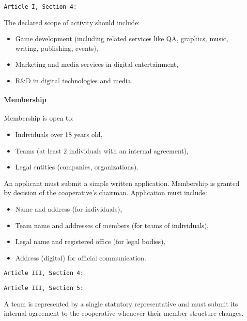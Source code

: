 \texttt{Article I, Section 4: }

The declared scope of activity should include:
\begin{itemize}
    \item Game development (including related services like QA, graphics, music, writing, publishing, events),
    \item Marketing and media services in digital entertainment,
    \item R\&D in digital technologies and media.
\end{itemize}
\paragraph{Membership}
Membership is open to:
\begin{itemize}
    \item Individuals over 18 years old,
    \item Teams (at least 2 individuals with an internal agreement),
    \item Legal entities (companies, organizations).
\end{itemize}
An applicant must submit a simple written application. Membership is granted by decision of the cooperative’s chairman. Application must include:
\begin{itemize}
    \item Name and address (for individuals),
    \item Team name and addresses of members (for teams of individuals),
    \item Legal name and registered office (for legal bodies),
    \item Address (digital) for official communication.
\end{itemize}

\texttt{Article III, Section 4: }

\texttt{Article III, Section 5: }

A team is represented by a single statutory representative and must submit its internal agreement to the cooperative whenever their member structure changes.
